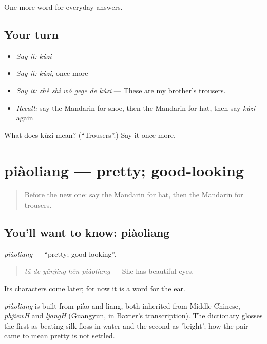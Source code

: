 \begin{grammarlens}[title={What you've built}]
One more word for everyday answers.
\end{grammarlens}

\subsection*{Your turn}
\begin{itemize}
\raggedright
  \item \emph{Say it:} \emph{kùzi}
  \item \emph{Say it:} \emph{kùzi}, once more
  \item \emph{Say it:} \emph{zhè shì wǒ gēge de kùzi} — These are my brother's trousers.
  \item \emph{Recall:} say the Mandarin for shoe, then the Mandarin for hat, then say \emph{kùzi} again
\end{itemize}

\begin{tcolorbox}[breakable,colback=teal!4,colframe=teal!35!black,title={Before you move on}]
What does kùzi mean? (\textquotedblleft{}Trousers\textquotedblright{}.) Say it once more.
\end{tcolorbox}
\section[piàoliang]{piàoliang — pretty; good-looking}

\label{lesson:ZH-C59-piaoliang}



\begin{quote}
Before the new one: say the Mandarin for hat, then the Mandarin for trousers.
\end{quote}

\subsection*{You'll want to know: piàoliang}
\emph{piàoliang} — \textquotedblleft{}pretty; good-looking\textquotedblright{}.

\begin{quote}
\emph{tā de yǎnjing hěn piàoliang} — She has beautiful eyes.
\end{quote}

Its characters come later; for now it is a word for the ear.

\begin{cousinweb}
\emph{piàoliang} is built from piào and liang, both inherited from Middle Chinese, \emph{phjiewH} and \emph{ljangH} (Guangyun, in Baxter's transcription). The dictionary glosses the first as beating silk floss in water and the second as 'bright'; how the pair came to mean pretty is not settled.
\end{cousinweb}

